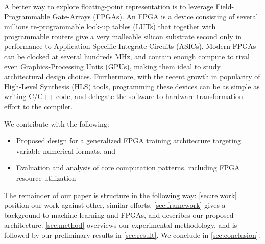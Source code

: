 \documentclass[techrep,english]{ipsj} %
\begin{document}
A better way to explore floating-point representation is to leverage Field-Programmable Gate-Arrays (FPGAs).
An FPGA is a device consisting of several millions re-programmable look-up tables (LUTs) that together with programmable routers give a very malleable silicon substrate second only in performance to Application-Specific Integrate Circuits (ASICs).
Modern FPGAs can be clocked at several hundreds MHz, and contain enough compute to rival even Graphics-Processing Units (GPUs), making them ideal to study architectural design choices.
Furthermore, with the recent growth in popularity of High-Level Synthesis (HLS) tools, programming these devices can be as simple as writing C/C++ code, and delegate the software-to-hardware transformation effort to the compiler.

We contribute with the following:
\begin{itemize}
\item Proposed design for a generalized FPGA training architecture targeting variable numerical formats, and
\item Evaluation and analysis of core computation patterns, including FPGA resource utilization
\end{itemize}

The remainder of our paper is structure in the following way: \cref{sec:relwork} position our work against other, similar efforts.
\cref{sec:framework} gives a background to machine learning and FPGAs, and describes our proposed architecture.
\cref{sec:method} overviews our experimental methodology, and is followed by our preliminary results in \cref{sec:result}.
We conclude in \cref{sec:conclusion}.
\end{document}
